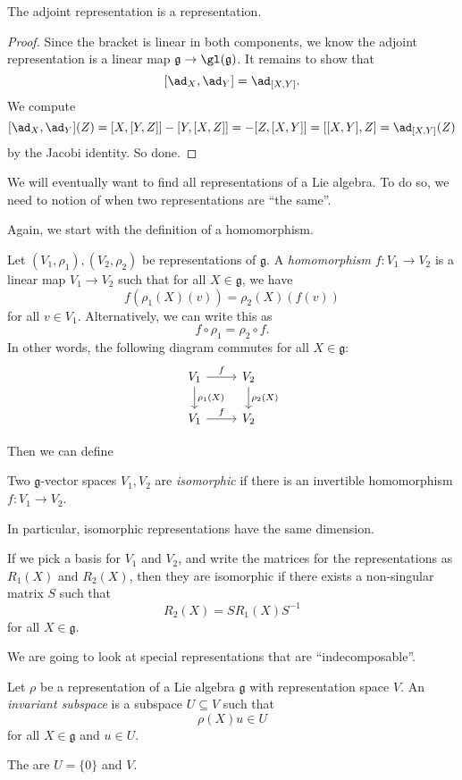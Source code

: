 \documentclass[a4paper]{article}
\begin{document}
\begin{prop}
  The adjoint representation is a representation.
\end{prop}

\begin{proof}
  Since the bracket is linear in both components, we know the adjoint representation is a linear map $\mathfrak{g} \to \gl(\mathfrak{g})$. It remains to show that
  \[
    [\ad_X, \ad_Y] = \ad_{[X, Y]}.
  \]
  We compute
  \[
    [\ad_X, \ad_Y](Z) = [X, [Y, Z]] - [Y, [X, Z]] = -[Z, [X, Y]] = [[X, Y], Z] = \ad_{[X, Y]}(Z)
  \]
  by the Jacobi identity. So done.
\end{proof}

We will eventually want to find all representations of a Lie algebra. To do so, we need to notion of when two representations are ``the same''.

Again, we start with the definition of a homomorphism.
\begin{defi}
  Let $(V_1, \rho_1), (V_2, \rho_2)$ be representations of $\mathfrak{g}$. A \emph{homomorphism} $f: V_1 \to V_2$ is a linear map $V_1 \to V_2$ such that for all $X \in \mathfrak{g}$, we have
  \[
    f(\rho_1(X)(v)) = \rho_2(X)(f(v))
  \]
  for all $v \in V_1$. Alternatively, we can write this as
  \[
    f \circ \rho_1 = \rho_2 \circ f.
  \]
  In other words, the following diagram commutes for all $X \in \mathfrak{g}$:
  \[
    \begin{tikzcd}
      V_1 \ar[r, "f"] \ar[d, "\rho_1(X)"] & V_2 \ar[d, "\rho_2(X)"]\\
      V_1 \ar[r, "f"] & V_2
    \end{tikzcd}
  \]
\end{defi}

Then we can define
\begin{defi}
  Two $\mathfrak{g}$-vector spaces $V_1, V_2$ are \emph{isomorphic} if there is an invertible homomorphism $f: V_1 \to V_2$.
\end{defi}
In particular, isomorphic representations have the same dimension.

If we pick a basis for $V_1$ and $V_2$, and write the matrices for the representations as $R_1(X)$ and $R_2(X)$, then they are isomorphic if there exists a non-singular matrix $S$ such that
\[
  R_2(X) = SR_1(X) S^{-1}
\]
for all $X \in \mathfrak{g}$.

We are going to look at special representations that are ``indecomposable''.
\begin{defi}
  Let $\rho$ be a representation of a Lie algebra $\mathfrak{g}$ with representation space $V$. An \emph{invariant subspace} is a subspace $U \subseteq V$ such that
  \[
    \rho(X) u \in U
  \]
  for all $X \in \mathfrak{g}$ and $u \in U$.

  The  are $U = \{0\}$ and $V$.
\end{defi}
\end{document}
